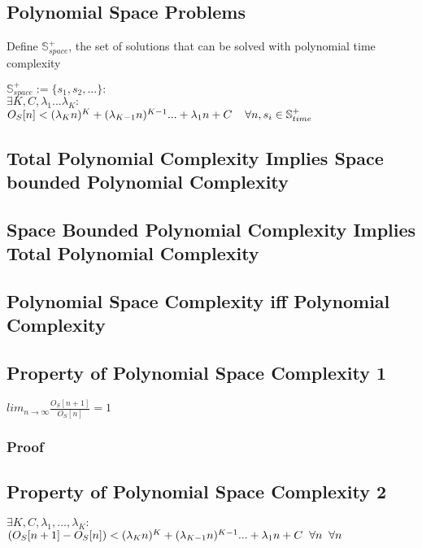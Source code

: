 \documentclass[11pt]{article}
\begin{document}
\subsection{Polynomial Space Problems}
Define $\mathbb{S}^+_{space}$, the set of solutions that can be solved with polynomial time complexity
\begin{center}
$
\mathbb{S}^+_{space} := \{s_1,s_2,...\} : 
$
\\
$
\exists K,C,\lambda_1...\lambda_K : 
$
\\
$
O_S[n] < (\lambda_K n)^K + (\lambda_{K-1} n)^{K-1}... + \lambda_1 n + C \hspace{4mm} \forall n, s_i \in \mathbb{S}^+_{time}
$
\end{center}







\subsection{Total Polynomial Complexity Implies Space bounded Polynomial Complexity}
\subsection{Space Bounded Polynomial Complexity Implies Total Polynomial Complexity}
\subsection{Polynomial Space Complexity iff Polynomial Complexity}








\subsection{Property of Polynomial Space Complexity 1}
\begin{center}
$
lim_{n \rightarrow \infty} \frac{O_S[n+1]}{O_S[n]} = 1
$
\end{center}
\subsubsection{Proof}







\subsection{Property of Polynomial Space Complexity 2}
\begin{center}
$
\exists K,C,\lambda_1,...,\lambda_K :
$
\\ \vspace{2mm}
$
( O_S[n+1] - O_S[n] ) < (\lambda_K n)^K + (\lambda_{K-1} n)^{K-1}... + \lambda_1 n + C \hspace{2mm} \forall n \hspace{2mm} \forall n
$
\end{center}
\end{document}
